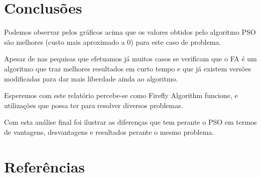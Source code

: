 \documentclass[10pt]{article}
\begin{document}
\newpage

\section{Conclusões}\label{sec:an-da-info-fin-da-org}
  Podemos observar pelos gráficos acima que os valores
  obtidos pelo algoritmo PSO são melhores 
  (custo mais aproximado a 0) para este caso de problema.

  Apesar de nas pequisas que efetuamos já muitos casos
  se verificam que o FA é um algoritmo que traz melhores resultados
  em curto tempo e que já existem versões modificadas para
  dar mais liberdade ainda ao algoritmo.

  Esperemos com este relatório percebe-se como Firefly
  Algorithm funcione, e utilizações que possa ter para resolver
  diversos problemas.
  
  Com esta análise final foi ilustrar as diferenças 
  que tem perante o PSO em termos de vantagens, desvantagens
  e resultados perante o mesmo problema.

\vspace{1cm}

\section{Referências}\label{sec:sup-inf-utl}


\nocite{FirePso}
\nocite{Firefly_par}



\pagebreak
\end{document}

